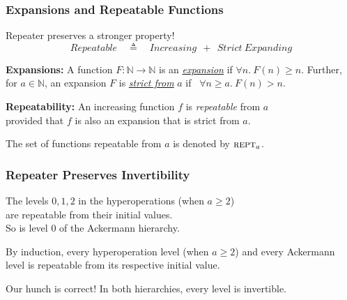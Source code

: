 \begin{frame}
\frametitle{Expansions and Repeatable Functions}

%
%
%

Repeater preserves a stronger property!
\begin{equation*}
Repeatable \quad \triangleq \quad Increasing~~+~~Strict \ Expanding
\end{equation*}

\pause 
\textbf{Expansions:} A function $F:\mathbb{N}\to\mathbb{N}$ is an
\href{https://github.com/inv-ack/inv-ack/blob/7270e64a2600b771f2b1b1b151f7d13fb2ae6c97/increasing_expanding.v\#L80-L82}{\emph{expansion}} if $\forall n.~ F(n)\ge n$. Further, for $a\in \mathbb{N}$, an expansion $F$ is
\href{https://github.com/inv-ack/inv-ack/blob/7270e64a2600b771f2b1b1b151f7d13fb2ae6c97/increasing_expanding.v\#L84-L86}{\emph{strict from}} $a$ if ~$\forall n \ge a.~ F(n) > n$.

\bigskip

\pause 
\textbf{Repeatability:} An increasing function $f$ is \emph{repeatable} from $a$ \\provided that $f$ is also an expansion that is strict from $a$.

\smallskip

The set of functions repeatable from $a$ is denoted by $\text{\scshape{rept}}_a$.

\end{frame}


\begin{frame}
\frametitle{Repeater Preserves Invertibility}
\label{frame:repeatable2}


\bigskip

\pause 
The levels $0, 1, 2$ in the hyperoperations (when $a\ge 2$) \\ are repeatable from their initial values.\\
So is level $0$ of the Ackermann hierarchy. 

\bigskip

\pause 
By induction, every hyperoperation level (when $a\ge 2$) and every Ackermann level is repeatable from its respective initial value.

\bigskip

\pause 
Our hunch is correct! In both hierarchies, every level is invertible.

\end{frame}


